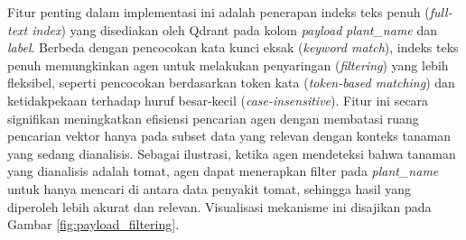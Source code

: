 \begin{table}[H]
    \centering
    \caption{Skema Poin (Vektor dan Payload) pada Indeks Qdrant}
    \label{tab:qdrant_schema}
    \small
\end{table}

Fitur penting dalam implementasi ini adalah penerapan indeks teks penuh (\textit{full-text index}) yang disediakan oleh Qdrant pada kolom \textit{payload} \textit{plant\_name} dan \textit{label}. Berbeda dengan pencocokan kata kunci eksak (\textit{keyword match}), indeks teks penuh memungkinkan agen untuk melakukan penyaringan (\textit{filtering}) yang lebih fleksibel, seperti pencocokan berdasarkan token kata (\textit{token-based matching}) dan ketidakpekaan terhadap huruf besar-kecil (\textit{case-insensitive}). Fitur ini secara signifikan meningkatkan efisiensi pencarian agen dengan membatasi ruang pencarian vektor hanya pada subset data yang relevan dengan konteks tanaman yang sedang dianalisis. Sebagai ilustrasi, ketika agen mendeteksi bahwa tanaman yang dianalisis adalah tomat, agen dapat menerapkan filter pada \textit{plant\_name} untuk hanya mencari di antara data penyakit tomat, sehingga hasil yang diperoleh lebih akurat dan relevan. Visualisasi mekanisme ini disajikan pada Gambar \ref{fig:payload_filtering}.

